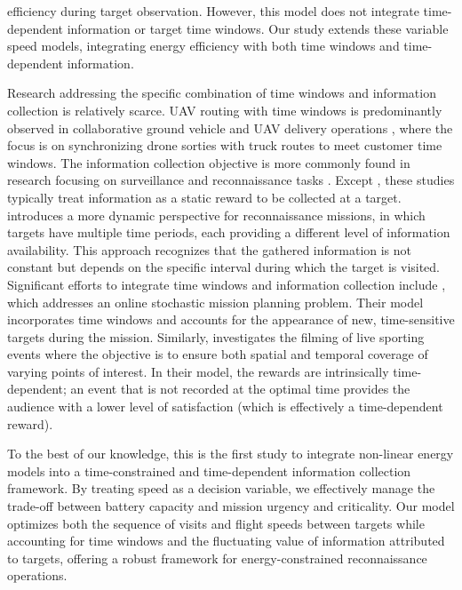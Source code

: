 \documentclass[11pt]{article}
\begin{document}
efficiency during target observation. However, this model does not integrate time-dependent information or target time windows. Our study extends these variable speed models, integrating energy efficiency with both time windows and time-dependent information. 

Research addressing the specific combination of time windows and information collection is relatively scarce. UAV routing with time windows is predominantly observed in collaborative ground vehicle and UAV delivery operations \citep{macrina2020drone}, where the focus is on synchronizing drone sorties with truck routes to meet customer time windows. The information collection objective is more commonly found in research focusing on surveillance and reconnaissance tasks \citep{dasdemir2022uav, evers2014robust, moskal2019adaptive, mufalli2012simultaneous}. Except \citep{dasdemir2022uav}, these studies typically treat information as a static reward to be collected at a target.  \citep{dasdemir2022uav} introduces a more dynamic perspective for reconnaissance missions, in which targets have multiple time periods, each providing a different level of information availability. This approach recognizes that the gathered information is not constant but depends on the specific interval during which the target is visited. Significant efforts to integrate time windows and information collection include \citep{evers2014online}, which addresses an online stochastic mission planning problem. Their model incorporates time windows and accounts for the appearance of new, time-sensitive targets during the mission. Similarly, \citep{guerriero2014multi} investigates the filming of live sporting events where the objective is to ensure both spatial and temporal coverage of varying points of interest. In their model, the rewards are intrinsically time-dependent; an event that is not recorded at the optimal time provides the audience with a lower level of satisfaction (which is effectively a time-dependent reward).

To the best of our knowledge, this is the first study to integrate non-linear energy models into a time-constrained and time-dependent information collection framework. By treating speed as a decision variable, we effectively manage the trade-off between battery capacity and mission urgency and criticality. Our model optimizes both the sequence of visits and flight speeds between targets while accounting for time windows and the fluctuating value of information attributed to targets, offering a robust framework for energy-constrained reconnaissance operations.
\end{document}
